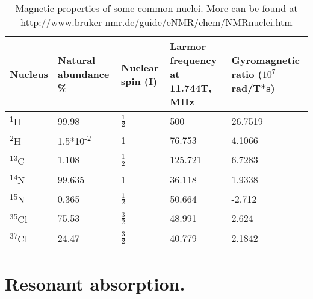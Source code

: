 \documentclass[a4paper, 12pt]{article}
\begin{document}
\begin{table}[ht]
\caption{Magnetic properties of some common nuclei. More can be found at \url{http://www.bruker-nmr.de/guide/eNMR/chem/NMRnuclei.htm} }
\label{tab:mag_properties}
\centering
\begin{tabular}{  C{1.0cm}  C{3.0cm}  C{1.0cm}  C{3.5cm}  C{3cm}}
\hline\hline
Nucleus & Natural abundance \% & Nuclear spin (I) & Larmor frequency at 11.744T, MHz & Gyromagnetic ratio ($10^7$ rad/T*s) \\
\hline
\textsuperscript{1}H & 99.98 & $\frac{1}{2}$ & 500 & 26.7519 \\
\textsuperscript{2}H & 1.5*10\textsuperscript{-2} & 1 & 76.753 & 4.1066 \\
\textsuperscript{13}C & 1.108 & $\frac{1}{2}$ & 125.721 & 6.7283 \\
\textsuperscript{14}N & 99.635 & 1 & 36.118 & 1.9338 \\
\textsuperscript{15}N & 0.365 &  $\frac{1}{2}$ & 50.664 & -2.712 \\
\textsuperscript{35}Cl & 75.53 &  $\frac{3}{2}$ & 48.991 & 2.624 \\
\textsuperscript{37}Cl & 24.47 &  $\frac{3}{2}$ & 40.779 & 2.1842 \\
\hline
\end{tabular}
\end{table}

\section{Resonant absorption.} \label{Res_absorbtion}
\end{document}
